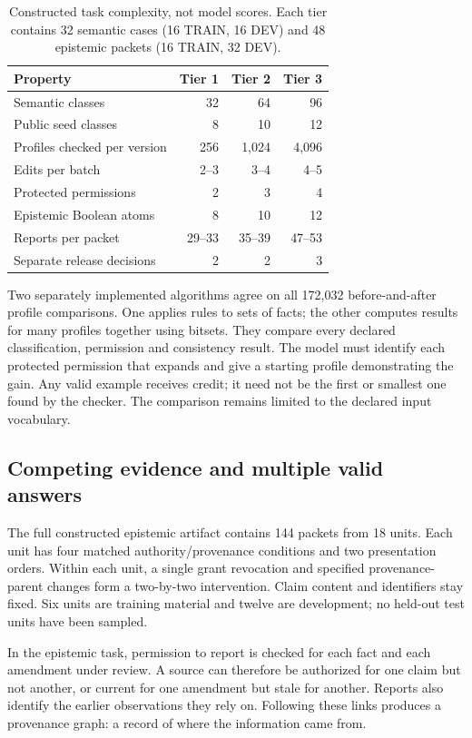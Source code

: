 \documentclass[a4paper,preprint,12pt,numbers,nopreprintline]{elsarticle}
\begin{document}
\begin{table}[htbp]\centering\small
\caption{Constructed task complexity, not model scores. Each tier contains 32 semantic cases (16 TRAIN, 16 DEV) and 48 epistemic packets (16 TRAIN, 32 DEV).}\label{tab:challenge-tiers}
\begin{tabular}{lrrr}\toprule
Property & Tier 1 & Tier 2 & Tier 3\\\midrule
Semantic classes & 32 & 64 & 96\\
Public seed classes & 8 & 10 & 12\\
Profiles checked per version & 256 & 1,024 & 4,096\\
Edits per batch & 2--3 & 3--4 & 4--5\\
Protected permissions & 2 & 3 & 4\\
Epistemic Boolean atoms & 8 & 10 & 12\\
Reports per packet & 29--33 & 35--39 & 47--53\\
Separate release decisions & 2 & 2 & 3\\\bottomrule
\end{tabular}\end{table}

Two separately implemented algorithms agree on all 172,032 before-and-after profile comparisons. One applies rules to sets of facts; the other computes results for many profiles together using bitsets. They compare every declared classification, permission and consistency result. The model must identify each protected permission that expands and give a starting profile demonstrating the gain. Any valid example receives credit; it need not be the first or smallest one found by the checker. The comparison remains limited to the declared input vocabulary.

\subsection{Competing evidence and multiple valid answers}
The full constructed epistemic artifact contains 144 packets from 18 units. Each unit has four matched authority/provenance conditions and two presentation orders. Within each unit, a single grant revocation and specified provenance-parent changes form a two-by-two intervention. Claim content and identifiers stay fixed. Six units are training material and twelve are development; no held-out test units have been sampled.

In the epistemic task, permission to report is checked for each fact and each amendment under review. A source can therefore be authorized for one claim but not another, or current for one amendment but stale for another. Reports also identify the earlier observations they rely on. Following these links produces a provenance graph: a record of where the information came from.
\end{document}
